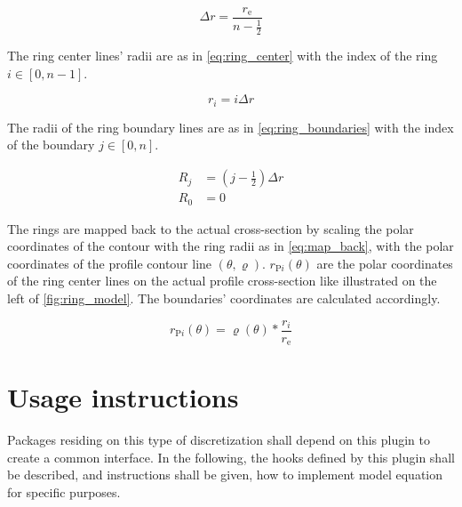 \documentclass[11pt]{PyRollDocs}
\begin{document}
    \begin{equation}
        \Delta r = \frac{r_{\mathrm{e}}}{n - \frac{1}{2}}
        \label{eq:delta_r}
    \end{equation}

    The ring center lines' radii are as in \autoref{eq:ring_center} with the index of the ring $i \in [0, n-1]$.

    \begin{equation}
        r_i = i \Delta r
        \label{eq:ring_center}
    \end{equation}

    The radii of the ring boundary lines are as in \autoref{eq:ring_boundaries} with the index of the boundary $j \in [0, n]$.

    \begin{subequations}
        \begin{align}
            R_j &= \left(j - \frac{1}{2}\right) \Delta r\\
            R_0 &= 0
        \end{align}
        \label{eq:ring_boundaries}
    \end{subequations}

    The rings are mapped back to the actual cross-section by scaling the polar coordinates of the contour with the ring radii as in \autoref{eq:map_back}, with the polar coordinates of the profile contour line $(\theta, \varrho)$. $r_{\mathrm{P}i}(\theta)$ are the polar coordinates of the ring center lines on the actual profile cross-section like illustrated on the left of \autoref{fig:ring_model}.
    The boundaries' coordinates are calculated accordingly.

    \begin{equation}
        r_{\mathrm{P}i}(\theta) = \varrho(\theta) * \frac{r_i}{r_{\mathrm{e}}}
        \label{eq:map_back}
    \end{equation}


    \section{Usage instructions}\label{sec:usage-instructions}

    Packages residing on this type of discretization shall depend on this plugin to create a common interface.
    In the following, the hooks defined by this plugin shall be described, and instructions shall be given, how to implement model equation for specific purposes.
\end{document}
